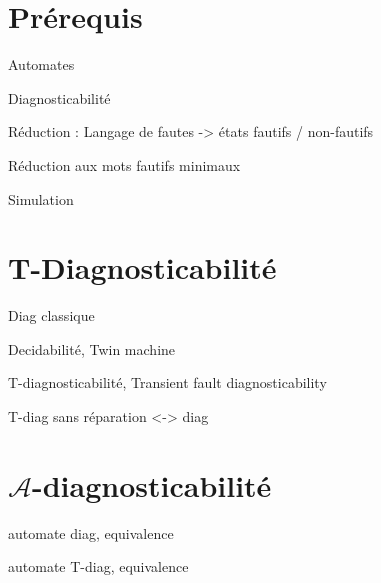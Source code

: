\documentclass[10pt,a4paper]{article}
\begin{document}
\section{Pr\'erequis}

Automates

Diagnosticabilit\'e

R\'eduction : Langage de fautes -> \'etats fautifs / non-fautifs

R\'eduction aux mots fautifs minimaux

Simulation

\section{T-Diagnosticabilit\'e}

Diag classique

Decidabilit\'e, Twin machine

T-diagnosticabilit\'e, Transient fault diagnosticability

T-diag sans r\'eparation <-> diag

\section{$\mathcal{A}$-diagnosticabilit\'e}

automate diag, equivalence

automate T-diag, equivalence
\end{document}
